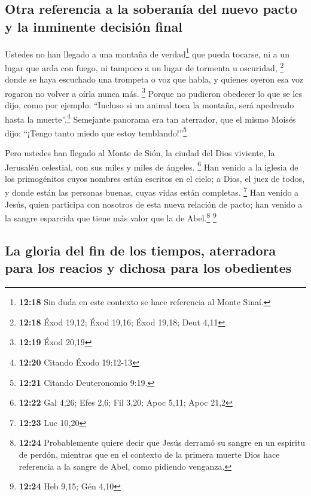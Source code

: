 \hypertarget{otra-referencia-a-la-soberanuxeda-del-nuevo-pacto-y-la-inminente-decisiuxf3n-final}{%
\subsection{Otra referencia a la soberanía del nuevo pacto y la
inminente decisión
final}\label{otra-referencia-a-la-soberanuxeda-del-nuevo-pacto-y-la-inminente-decisiuxf3n-final}}

 Ustedes no han llegado a una montaña de
verdad\footnote{\textbf{12:18} Sin duda en este contexto se hace
  referencia al Monte Sinaí.} que pueda tocarse, ni a un lugar que arda
con fuego, ni tampoco a un lugar de tormenta u oscuridad, \footnote{\textbf{12:18}
  Éxod 19,12; Éxod 19,16; Éxod 19,18; Deut 4,11}  donde
se haya escuchado una trompeta o voz que habla, y quienes oyeron esa voz
rogaron no volver a oírla nunca más. \footnote{\textbf{12:19} Éxod 20,19}
 Porque no pudieron obedecer lo que se les dijo, como por
ejemplo: ``Incluso si un animal toca la montaña, será apedreado hasta la
muerte''.\footnote{\textbf{12:20} Citando Éxodo 19:12-13}
 Semejante panorama era tan aterrador, que el mismo
Moisés dijo: ``¡Tengo tanto miedo que estoy temblando!''\footnote{\textbf{12:21}
  Citando Deuteronomio 9:19.}

 Pero ustedes han llegado al Monte de Sión, la ciudad del
Dios viviente, la Jerusalén celestial, con sus miles y miles de ángeles.
\footnote{\textbf{12:22} Gal 4,26; Efes 2,6; Fil 3,20; Apoc 5,11; Apoc
  21,2}  Han venido a la iglesia de los primogénitos
cuyos nombres están escritos en el cielo; a Dios, el juez de todos, y
donde están las personas buenas, cuyas vidas están completas.
\footnote{\textbf{12:23} Luc 10,20}  Han venido a Jesús,
quien participa con nosotros de esta nueva relación de pacto; han venido
a la sangre esparcida que tiene más valor que la de Abel.\footnote{\textbf{12:24}
  Probablemente quiere decir que Jesús derramó su sangre en un espíritu
  de perdón, mientras que en el contexto de la primera muerte Dios hace
  referencia a la sangre de Abel, como pidiendo venganza.} \footnote{\textbf{12:24}
  Heb 9,15; Gén 4,10}

\hypertarget{la-gloria-del-fin-de-los-tiempos-aterradora-para-los-reacios-y-dichosa-para-los-obedientes}{%
\subsection{La gloria del fin de los tiempos, aterradora para los
reacios y dichosa para los
obedientes}\label{la-gloria-del-fin-de-los-tiempos-aterradora-para-los-reacios-y-dichosa-para-los-obedientes}}

